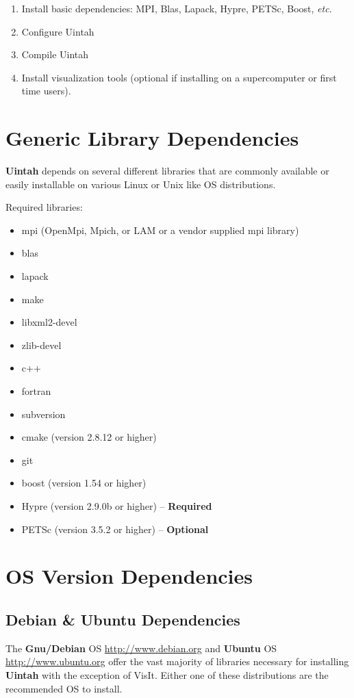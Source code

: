 \documentclass[12pt]{article}
\begin{document}
\begin{enumerate}

\item Install basic dependencies: MPI, Blas, Lapack, Hypre, PETSc,
  Boost, \emph{etc}.

\item Configure Uintah

\item Compile Uintah

\item Install visualization tools (optional if installing on a
  supercomputer or first time users).


\end{enumerate}



\section{Generic Library Dependencies}

\textbf{Uintah} depends on several different libraries that are
commonly available or easily installable on various Linux or Unix like
OS distributions.

Required libraries:
\begin{itemize}
\item mpi (OpenMpi, Mpich, or LAM or a vendor supplied mpi library)
\item blas
\item lapack
\item make
\item libxml2-devel
\item zlib-devel
\item c++
\item fortran
\item subversion
\item cmake (version 2.8.12 or higher)
\item git
\item boost (version 1.54 or higher)
\item Hypre (version 2.9.0b or higher) -- \textbf{Required}
\item PETSc (version 3.5.2 or higher) -- \textbf{Optional}
\end{itemize}


\section{OS Version Dependencies}
\label{sec:dependencies}
\subsection{Debian \& Ubuntu Dependencies}
\label{sec:debian_dependencies}
The \textbf{Gnu/Debian} OS \url{http://www.debian.org} and
\textbf{Ubuntu} OS \url{http://www.ubuntu.org} offer the vast majority
of libraries necessary for installing \textbf{Uintah} with the
exception of VisIt.  Either one of these distributions are
the recommended OS to install.
\end{document}
